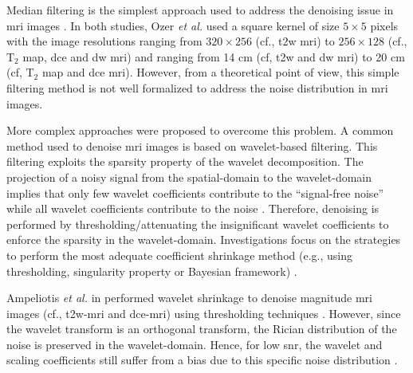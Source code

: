 \begin{enumerate}[leftmargin=*]
Median filtering is the simplest approach used to address the denoising issue in \ac{mri} images \cite{Ozer2009,Ozer2010}.
In both studies, Ozer \textit{et al.} used a square kernel of size $5 \times 5$ pixels with the image resolutions ranging from $320 \times 256$ (cf., \ac{t2w} \ac{mri}) to $256 \times 128$ (cf., T$_2$ map, \ac{dce} and \ac{dw} \ac{mri}) and  ranging from 14 cm (cf, \ac{t2w} and \ac{dw} \ac{mri}) to 20 cm (cf, T$_2$ map and \ac{dce} \ac{mri}).
However, from a theoretical point of view, this simple filtering method is not well formalized to address the noise distribution in \ac{mri} images.

More complex approaches were proposed to overcome this problem.
A common method used to denoise \ac{mri} images is based on wavelet-based filtering.
This filtering exploits the sparsity property of the wavelet decomposition.
The projection of a noisy signal from the spatial-domain to the wavelet-domain implies that only few wavelet coefficients contribute to the ``signal-free noise'' while all wavelet coefficients contribute to the noise \cite{Donoho1994}.
Therefore, denoising is performed by thresholding/attenuating the insignificant wavelet coefficients to enforce the sparsity in the wavelet-domain.
Investigations focus on the strategies to perform the most adequate coefficient shrinkage method (e.g., using thresholding, singularity property or Bayesian framework) \cite{Pizurica2002}.

Ampeliotis \textit{et al.} in \cite{Ampeliotis2007,Ampeliotis2008} performed wavelet shrinkage to denoise magnitude \ac{mri} images (cf., \ac{t2w}-\ac{mri} and \ac{dce}-\ac{mri}) using thresholding techniques \cite{Mallat2008}.
However, since the wavelet transform is an orthogonal transform, the Rician distribution of the noise is preserved in the wavelet-domain.
Hence, for low \ac{snr}, the wavelet and scaling coefficients still suffer from a bias due to this specific noise distribution \cite{Nowak1999}.
 

\end{enumerate}
